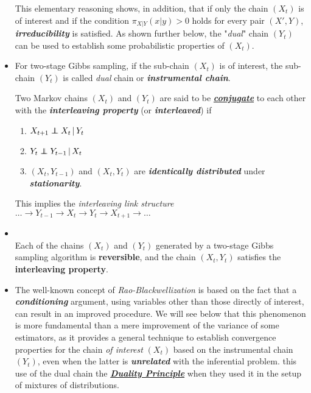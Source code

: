 \documentclass[11pt]{article}
\begin{document}
\begin{itemize}
This elementary reasoning shows, in addition, that if only the chain $(X_t)$ is of interest and if the condition $\pi_{X|Y}(x|y) > 0 $ holds for every pair $(X', Y)$, \textbf{\emph{irreducibility}} is satisfied. As shown further below, the "\emph{dual}" chain $(Y_t)$ can be used to establish some probabilistic properties of $(X_t)$.

\item For two-stage Gibbs sampling, if the sub-chain $(X_t)$ is of interest, the sub-chain $(Y_t)$ is called \emph{dual} chain or \emph{\textbf{instrumental chain}}. 
\begin{definition}
Two Markov chains $(X_t)$ and $(Y_t)$ are said to be \underline{\emph{\textbf{conjugate}}} to each other with the \emph{\textbf{interleaving property}} (or \emph{\textbf{interleaved}}) if
\begin{enumerate}
\item $X_{t+1} \indep X_t \,|\, Y_{t}$
\item $Y_t \indep Y_{t-1} \,|\, X_{t}$
\item $(X_t, Y_{t-1})$ and $(X_t, Y_{t})$ are \emph{\textbf{identically distributed}} under \emph{\textbf{stationarity}}.
\end{enumerate}
\end{definition} This implies the \emph{interleaving link structure} $\ldots \rightarrow Y_{t-1} \rightarrow X_t \rightarrow Y_{t} \rightarrow X_{t+1} \rightarrow \ldots$

\item \begin{lemma}\citep{robert1999monte}\\
Each of the chains $(X_t)$ and $(Y_t)$ generated by a two-stage Gibbs sampling algorithm is \textbf{reversible}, and the chain $(X_t, Y_{t})$ satisfies the \textbf{interleaving property}.
\end{lemma}

\item The well-known concept of \emph{Rao-Blackwellization} is based on the fact that a \emph{\textbf{conditioning}} argument, using variables other than those directly of interest, can result in an improved procedure. We will see below that this phenomenon is more fundamental than a mere improvement of the variance of some estimators, as it provides a general technique to establish convergence properties for the chain \emph{of interest} $(X_t)$ based on the instrumental chain $(Y_t)$, even when the latter is \emph{\textbf{unrelated}} with the inferential problem. this use of the dual chain the \underline{\emph{\textbf{Duality Principle}}} when they used it in the setup of mixtures of distributions.


\end{itemize}
\end{document}
